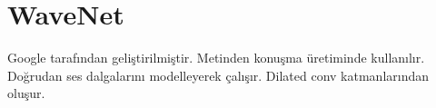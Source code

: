 \section{WaveNet}
Google tarafından geliştirilmiştir. Metinden konuşma üretiminde kullanılır. Doğrudan ses dalgalarını modelleyerek çalışır. Dilated conv katmanlarından oluşur.

\newpage